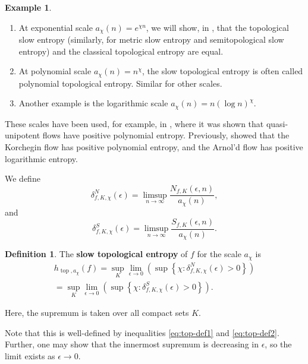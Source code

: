 \documentclass[oneside]{amsart}
\theoremstyle{plain}
\theoremstyle{definition}
\newtheorem{DEF}[THM]{Definition}
\newtheorem{EX}[THM]{Example}
\newcommand{\<}{\langle}
\renewcommand{\>}{\rangle}
\newcommand{\e}{\epsilon}
\newcommand{\topo}{\operatorname{top}}
\renewcommand{\|}{|\!|} %
\begin{document}
\begin{EX}
    \begin{enumerate}
        \item At exponential scale  $a_\chi(n) = e^{\chi n}$, we will show, in , that the topological slow entropy (similarly, for metric slow entropy and semitopological slow entropy) and the classical topological entropy are equal.
        \item At polynomial scale  $a_\chi(n) = n^\chi$,  the slow topological entropy is often called polynomial topological entropy. Similar for other scales.
        \item Another example is the logarithmic scale $a_\chi(n) = n(\log n)^\chi$. 
    \end{enumerate}
    These scales have been used, for example, in \cite[Theorem 1.7]{ParabolicFlows}, where it was shown that quasi-unipotent flows have positive polynomial entropy. Previously, \cite[Theorems 1.1 and 1.2]{SpecialFlows} showed that the Korchegin flow has positive polynomial entropy, and the Arnol'd flow has positive logarithmic entropy.
\end{EX}
We define 
\begin{equation*}
    \delta_{f,K,\chi}^N(\e) = \limsup_{n \to \infty} \frac{N_{f,K}(\e,n)}{a_\chi(n)},
\end{equation*} 
and 
\begin{equation*}
    \delta_{f,K,\chi}^S(\e) = \limsup_{n \to \infty} \frac{S_{f,K}(\e,n)}{a_\chi(n)}.
\end{equation*}






\begin{DEF}
The {\bf slow topological entropy} of $f$ for the scale $a_\chi$ is
\begin{align*}
        h_{\topo,a_\chi}(f)=\sup_{K}\lim_{\e \to 0}\left( \sup \left\{ \chi:
    \delta_{f,K,\chi}^N(\e)>0 \right\}\right) \\
    =
    \sup_{K}\lim_{\e \to 0}\left( \sup \left\{ \chi:
    \delta_{f,K,\chi}^S(\e)>0 \right\}\right).
\end{align*}

Here, the supremum is taken over all compact sets $K$.
\label{def:MetricEntropy}
\end{DEF}

Note that this is well-defined by inequalities \eqref{eq:top-def1} and \eqref{eq:top-def2}. Further, one may show that the innermost supremum is decreasing in $\e$, so the limit exists as $\e \to 0$.
\end{document}
